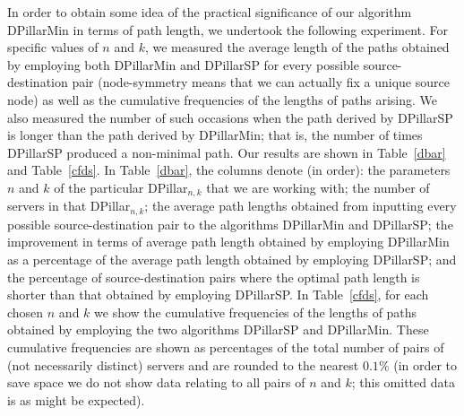\documentclass{article}
\begin{document}
In order to obtain some idea of the practical significance of our algorithm DPillarMin in terms of path length, we undertook the following experiment. For specific values of $n$ and $k$, we measured the average length of the paths obtained by employing both DPillarMin and DPillarSP for every possible source-destination pair (node-symmetry means that we can actually fix a unique source node) as well as the cumulative frequencies of the lengths of paths arising. We also measured the number of such occasions when the path derived by DPillarSP is longer than the path derived by DPillarMin; that is, the number of times DPillarSP produced a non-minimal path. Our results are shown in Table~\ref{dbar} and Table~\ref{cfds}. In Table~\ref{dbar}, the columns denote (in order): the parameters $n$ and $k$ of the particular DPillar$_{n,k}$ that we are working with; the number of servers in that DPillar$_{n,k}$; the average path lengths obtained from inputting every possible source-destination pair to the algorithms DPillarMin and DPillarSP; the improvement in terms of average path length obtained by employing DPillarMin as a percentage of the average path length obtained by employing DPillarSP; and the percentage of source-destination pairs where the optimal path length is shorter than that obtained by employing DPillarSP. In Table~\ref{cfds}, for each chosen $n$ and $k$ we show the cumulative frequencies of the lengths of paths obtained by employing the two algorithms DPillarSP and DPillarMin. These cumulative frequencies are shown as percentages of the total number of pairs of (not necessarily distinct) servers and are rounded to the nearest $0.1$\% (in order to save space we do not show data relating to all pairs of $n$ and $k$; this omitted data is as might be expected).
\end{document}
